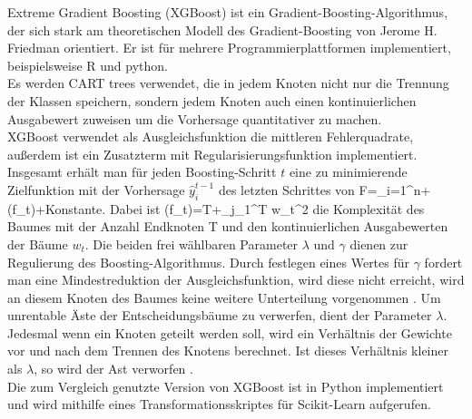 Extreme Gradient Boosting (XGBoost) \cite{DBLP:journals/corr/ChenG16} ist ein Gradient-Boosting-Algorithmus, der sich stark am theoretischen Modell des Gradient-Boosting von Jerome H. Friedman \cite{Friedman00greedyfunction} orientiert. Er ist f\"ur mehrere Programmierplattformen implementiert, beispielsweise R und python.\\
Es werden CART trees verwendet, die in jedem Knoten nicht nur die Trennung der Klassen speichern, sondern jedem Knoten auch einen kontinuierlichen Ausgabewert zuweisen um die Vorhersage quantitativer zu machen.\\
XGBoost verwendet als Ausgleichsfunktion die mittleren Fehlerquadrate, au\ss erdem ist ein Zusatzterm mit Regularisierungsfunktion implementiert. Insgesamt erh\"alt man f\"ur jeden Boosting-Schritt $t$ eine zu minimierende Zielfunktion mit der Vorhersage $\hat y_i^{t-1}$ des letzten Schrittes von
\beq
F=\sum_{i=1}^n+\Omega\left(f_t\right)+Konstante.
\label{eq:xgb_zielfkt}
\eeq
Dabei ist
\beq
\Omega\left(f_t\right)=\gamma T+\lambda\sum_{j_1}^T w_t^2
\label{eq:complexity}
\eeq
die Komplexit\"at des Baumes mit der Anzahl Endknoten T und den kontinuierlichen Ausgabewerten der B\"aume $w_t$. Die beiden frei w\"ahlbaren Parameter $\lambda$ und $\gamma$ dienen zur Regulierung des Boosting-Algorithmus. Durch festlegen eines Wertes f\"ur $\gamma$ fordert man eine Mindestreduktion der Ausgleichsfunktion, wird diese nicht erreicht, wird an diesem Knoten des Baumes keine weitere Unterteilung vorgenommen \cite{xgb_skl_wrapper}. Um unrentable \"Aste der Entscheidungsb\"aume zu verwerfen, dient der Parameter $\lambda$. Jedesmal wenn ein Knoten geteilt werden soll, wird ein Verh\"altnis der Gewichte vor und nach dem Trennen des Knotens berechnet. Ist dieses Verh\"altnis kleiner als $\lambda$, so wird der Ast verworfen \cite{xgb_tree}.\\
Die zum Vergleich genutzte Version von XGBoost ist in Python implementiert und wird mithilfe eines Transformationsskriptes f\"ur Scikit-Learn aufgerufen.
